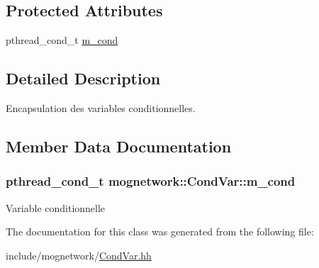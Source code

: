 \subsection*{Protected Attributes}
\begin{DoxyCompactItemize}
\item 
pthread\-\_\-cond\-\_\-t \hyperlink{classmognetwork_1_1_cond_var_adc18d17b3c2e11768b1103b499f49c97}{m\-\_\-cond}
\end{DoxyCompactItemize}


\subsection{Detailed Description}
Encapsulation des variables conditionnelles. 

\subsection{Member Data Documentation}
\hypertarget{classmognetwork_1_1_cond_var_adc18d17b3c2e11768b1103b499f49c97}{
\subsubsection[{m\-\_\-cond}]{\setlength{\rightskip}{0pt plus 5cm}pthread\-\_\-cond\-\_\-t mognetwork\-::\-Cond\-Var\-::m\-\_\-cond\hspace{0.3cm}{\ttfamily [protected]}}}\label{classmognetwork_1_1_cond_var_adc18d17b3c2e11768b1103b499f49c97}
Variable conditionnelle 

The documentation for this class was generated from the following file\-:\begin{DoxyCompactItemize}
\item 
include/mognetwork/\hyperlink{_cond_var_8hh}{Cond\-Var.\-hh}\end{DoxyCompactItemize}
